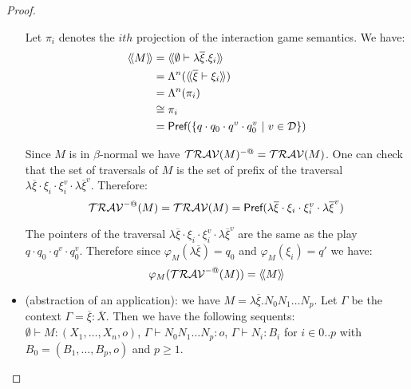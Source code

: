 \begin{proof}
\begin{itemize}
        Let $\pi_i$ denotes the $ith$ projection of the interaction game
        semantics. We have:
        \begin{align*}
        {\langle\!\langle M \rangle\!\rangle} &= {\langle\!\langle \emptyset \vdash \lambda \overline{\xi} . \xi_i \rangle\!\rangle} \\
                     &= \Lambda^n({\langle\!\langle \overline{\xi} \vdash  \xi_i \rangle\!\rangle}) \\
                     &= \Lambda^n(\pi_i) \\
                     &\cong \pi_i \\
                     &= \textsf{Pref}(\{ q \cdot q_0 \cdot q^v \cdot q_0^v \ | \ v\in \mathcal{D} \})
        \end{align*}

        Since $M$ is in $\beta$-normal we have $\mathcal{TRAV}(M)^{-@} = \mathcal{TRAV}(M)$.
        One can check that the set of traversals of $M$ is the set of prefix of
        the traversal $\lambda \overline{\xi} \cdot \xi_i \cdot \xi_i^v \cdot \lambda
        \overline{\xi}^v$. Therefore:
        $$ \mathcal{TRAV}^{-@}(M) = \mathcal{TRAV}(M) = \textsf{Pref}( \lambda \overline{\xi} \cdot \xi_i \cdot \xi_i^v \cdot \lambda \overline{\xi}^v)
        $$

        The pointers of the traversal $\lambda \overline{\xi} \cdot \xi_i \cdot \xi_i^v \cdot \lambda
        \overline{\xi}^v$ are the same as the play $q \cdot q_0 \cdot q^v \cdot
        q_0^v$. Therefore since $\varphi_M(\lambda \overline{\xi}) = q_0$ and $\varphi_M(\xi_i) =
        q'$ we have:
        $$ \varphi_M(\mathcal{TRAV}^{-@}(M)) = {\langle\!\langle M \rangle\!\rangle}$$


    \item (abstraction of an application): we have $M = \lambda \overline{\xi} . N_0 N_1 \ldots N_p$. Let $\Gamma$ be the context
    $\Gamma = \overline{\xi} : \overline{X}$. Then we have the following sequents:
    $\emptyset \vdash M : (X_1,\ldots,X_n,o)$,
    $\Gamma \vdash N_0 N_1 \ldots N_p : o$,
    $\Gamma \vdash N_i : B_i$ for $i\in 0..p$ with $B_0 = (B_1,\ldots,B_p,o)$ and $p\geq 1$.


\end{itemize}
\end{proof}
